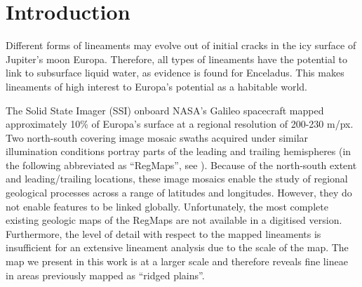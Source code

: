 \section{Introduction} \label{sec:intro}

Different forms of lineaments may evolve out of initial cracks in the icy surface of Jupiter’s moon Europa. Therefore, all types of lineaments have the potential to link to subsurface liquid water, as evidence is found for Enceladus. This makes lineaments of high interest to Europa's potential as a habitable world.


The Solid State Imager (SSI) onboard NASA’s Galileo spacecraft mapped approximately 10\% of Europa’s surface at a regional resolution of 200-230 m/px. Two north-south covering image mosaic swaths acquired under similar illumination conditions portray parts of the leading and trailing hemispheres (in the following abbreviated as ``RegMaps'', see ). Because of the north-south extent and leading/trailing locations, these image mosaics enable the study of regional geological processes across a range of latitudes and longitudes. However, they do not enable features to be linked globally. 
Unfortunately, the most complete existing geologic maps of the RegMaps are not available in a digitised version. Furthermore, the level of detail with respect to the mapped lineaments is insufficient for an extensive lineament analysis due to the scale of the map. The map we present in this work is at a larger scale and therefore reveals fine lineae in areas previously mapped as ``ridged plains''.


